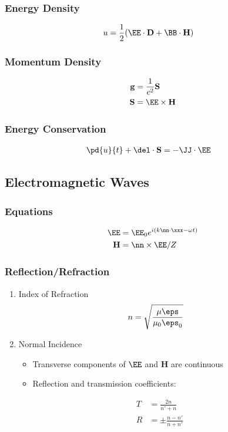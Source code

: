 \documentclass[11pt]{article}
\renewcommand{\HH}{\mathbf{H}}
\newcommand{\DD}{\mathbf{D}}
\renewcommand{\SS}{\mathbf{S}}
\begin{document}
\subsubsection{Energy Density}
\label{sec:orgeffb9e0}
\begin{align*}
u & = \frac{1}{2} (\EE \cdot \DD + \BB \cdot \HH)
\end{align*}
\subsubsection{Momentum Density}
\label{sec:orgb3f8940}
\begin{align*}
\mathbf{g} & = \frac{1}{c^2} \SS \\
\SS & = \EE \times \HH
\end{align*}
\subsubsection{Energy Conservation}
\label{sec:org56f7c62}
\begin{align*}
\pd{u}{t} + \del \cdot \SS & = -\JJ \cdot \EE
\end{align*}
\subsection{Electromagnetic Waves}
\label{sec:org172606e}
\subsubsection{Equations}
\label{sec:orgb0f689d}
\begin{align*}
\EE & = \EE_0 e^{i(k \nn \cdot \xxx - \omega t)} \\
\HH & = \nn \times \EE / Z
\end{align*}
\subsubsection{Reflection/Refraction}
\label{sec:org8b095a9}
\begin{enumerate}
\item Index of Refraction
\label{sec:org9d77660}
\begin{align*}
n & = \sqrt{\frac{\mu \eps}{\mu_0 \eps_0}}
\end{align*}
\item Normal Incidence
\label{sec:org7e03446}
\begin{itemize}
\item Transverse components of \(\EE\) and \(\HH\) are continuous
\item Reflection and transmission coefficients:
\end{itemize}
\begin{align*}
T & = \frac{2n}{n' + n} \\
R & = \pm \frac{n-n'}{n+n'} \\
\end{align*}
\end{enumerate}
\end{document}
